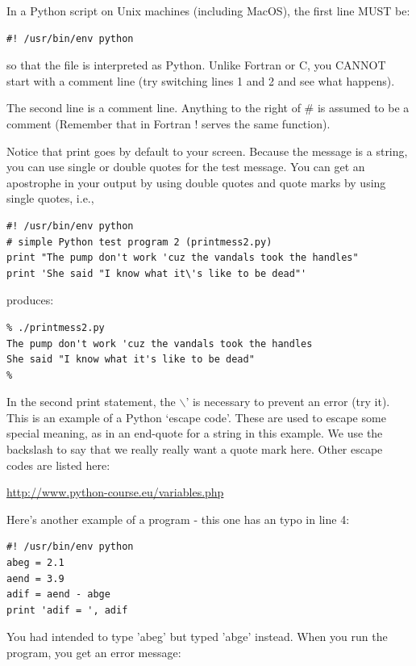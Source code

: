 \documentclass[11pt]{book}
\begin{document}
{\noindent
In a Python script on Unix machines (including MacOS), the  first line MUST be: 

{ \color{blue} \begin{verbatim}
#! /usr/bin/env python
\end{verbatim}}

\noindent
so that the file is interpreted as Python.  Unlike Fortran or C, you CANNOT start with a
comment line (try switching lines 1 and 2 and see what happens). 

The second line is a comment line.  Anything to the right of \# is assumed to be a comment
(Remember that in Fortran {\color{blue}! } serves the same function).

Notice that print goes by default to your screen.  Because the message is a string, you can use single or double quotes
for the test message.  You can get an apostrophe in your output by using double quotes
and quote marks by using single quotes, i.e.,

{ \color{blue} \begin{verbatim}
#! /usr/bin/env python
# simple Python test program 2 (printmess2.py)
print "The pump don't work 'cuz the vandals took the handles"
print 'She said "I know what it\'s like to be dead"'
\end{verbatim}}

\noindent
produces:

{ \color{blue} \begin{verbatim}
% ./printmess2.py
The pump don't work 'cuz the vandals took the handles
She said "I know what it's like to be dead"
%
\end{verbatim}}

\noindent
In the second print statement, the $\backslash$' is necessary to prevent an error (try it).   This is an example of a Python `escape code'.   These are used to escape some special meaning, as in an end-quote for a string in this example. We use the backslash to say that we really really want a quote mark here.   Other escape codes are listed here:  

\url{http://www.python-course.eu/variables.php}

Here's another example of a program - this one has an typo in line 4:

{ \color{blue} \begin{verbatim}
#! /usr/bin/env python
abeg = 2.1
aend = 3.9
adif = aend - abge
print 'adif = ', adif
\end{verbatim}}

\noindent
You had intended to type 'abeg' but typed 'abge' instead.  When
you run the program, you get an error message:

}
\end{document}
